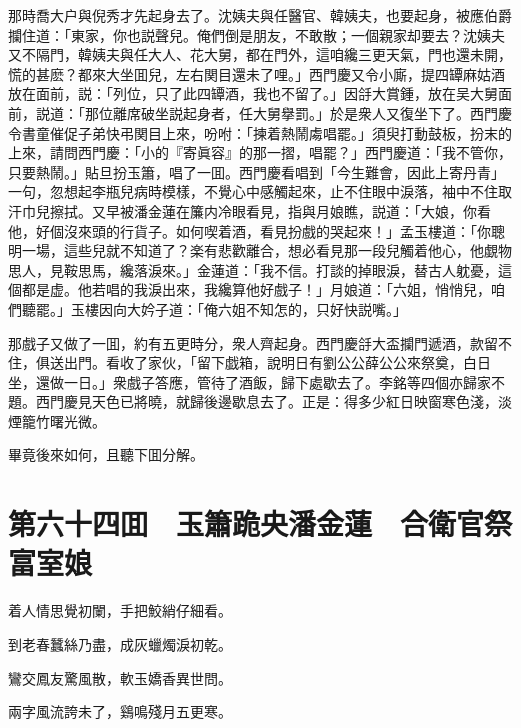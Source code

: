 那時喬大户與倪秀才先起身去了。沈姨夫與任醫官、韓姨夫，也要起身，被應伯爵攔住道：「東家，你也説聲兒。俺們倒是朋友，不敢散；一個親家却要去？沈姨夫又不隔門，韓姨夫與任大人、花大舅，都在門外，這咱纔三更天氣，門也還未開，慌的甚麽？都來大坐囬兒，左右関目還未了哩。」西門慶又令小廝，提四罈麻姑酒放在面前，説：「列位，只了此四罈酒，我也不留了。」因㧱大賞鍾，放在吴大舅面前，説道：「那位離席破坐説起身者，任大舅擧罰。」於是衆人又復坐下了。西門慶令書童催促子弟快弔関目上來，吩咐：「揀着熱鬧䖏唱罷。」須臾打動鼓板，扮末的上來，請問西門慶：「小的『寄眞容』的那一摺，唱罷？」西門慶道：「我不管你，只要熱鬧。」貼旦扮玉簫，唱了一囬。西門慶看唱到「今生難會，因此上寄丹青」一句，忽想起李瓶兒病時模樣，不覺心中感觸起來，止不住眼中淚落，袖中不住取汗巾兒擦拭。又早被潘金蓮在簾内冷眼看見，指與月娘瞧，説道：「大娘，你看他，好個沒來頭的行貨子。如何喫着酒，看見扮戲的哭起來！」孟玉樓道：「你聰明一場，這些兒就不知道了？楽有悲歡離合，想必看見那一段兒觸着他心，他覷物思人，見鞍思馬，纔落淚來。」金蓮道：「我不信。打談的掉眼淚，替古人躭憂，這個都是虚。他若唱的我淚出來，我纔算他好戲子！」月娘道：「六姐，悄悄兒，咱們聽罷。」玉樓因向大妗子道：「俺六姐不知怎的，只好快説嘴。」

那戲子又做了一囬，約有五更時分，衆人齊起身。西門慶㧱大盃攔門遞酒，款留不住，俱送出門。看收了家伙，「留下戯箱，說明日有劉公公薛公公來祭奠，白日坐，還做一日。」衆戲子答應，管待了酒飯，歸下處歇去了。李銘等四個亦歸家不題。西門慶見天色已將曉，就歸後邊歇息去了。正是：得多少紅日映窗寒色淺，淡煙籠竹曙光微。

畢竟後來如何，且聽下囬分解。

\chapter*{第六十四囬　玉簫跪央潘金蓮　合衛官祭富室娘}

着人情思覺初闌，手把鮫綃仔細看。

到老春蠶絲乃盡，成灰蠟燭淚初乾。

鸞交鳳友驚風散，軟玉嬌香異世問。

兩字風流誇未了，鷄鳴殘月五更寒。

